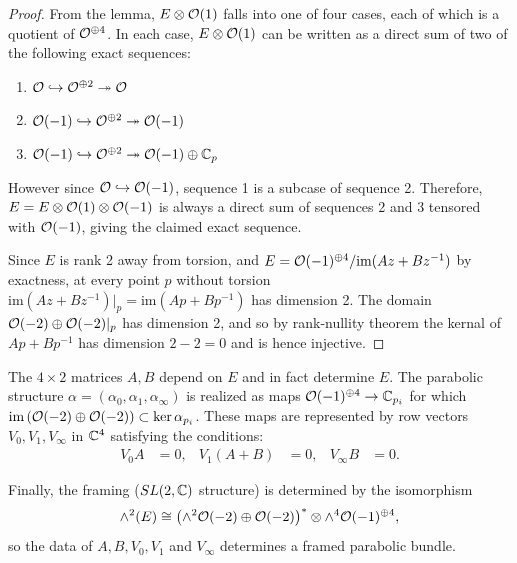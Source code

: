 	\begin{proof}
		From the lemma, $E\otimes \mathcal{O}(1)$ falls into one of four cases, each of which is a quotient of $\mathcal{O}^{\oplus 4}$. In each case, $E\otimes \mathcal{O}(1)$ can be written as a direct sum of two of the following exact sequences:
		\begin{enumerate}
			\item $\mathcal{O} \hookrightarrow \mathcal{O}^{\oplus 2} \twoheadrightarrow \mathcal{O}$
			\item $\mathcal{O}(-1) \hookrightarrow \mathcal{O}^{\oplus 2}\twoheadrightarrow \mathcal{O}(-1) $
			\item $\mathcal{O}(-1)\hookrightarrow \mathcal{O}^{\oplus 2}\twoheadrightarrow \mathcal{O}(-1)\oplus \mathbb{C}_p$
		\end{enumerate}
		However since $\mathcal{O} \hookrightarrow \mathcal{O}(-1)$, sequence 1 is a subcase of sequence 2. Therefore, $E = E\otimes \mathcal{O}(1)\otimes \mathcal{O}(-1)$ is always a direct sum of sequences 2 and 3 tensored with $\mathcal{O}(-1)$, giving the claimed exact sequence.
		
		Since $E$ is rank 2 away from torsion, and $E = \mathcal{O}(-1)^{\oplus 4}/\text{im}(Az+Bz^{-1})$ by exactness, at every point $p$ without torsion $\text{im}(Az+Bz^{-1})|_p = \text{im}(Ap+Bp^{-1})$ has dimension 2. The domain $\mathcal{O}(-2)\oplus\mathcal{O}(-2)|_p$ has dimension 2, and so by rank-nullity theorem the kernal of $Ap+Bp^{-1}$ has dimension $2-2=0$ and is hence injective. 
	\end{proof}
	The $4\times2$ matrices $A,B$ depend on $E$ and in fact determine $E$. The parabolic structure $\alpha = (\alpha_0,\alpha_1,\alpha_\infty)$ is realized as maps $\mathcal{O}(-1)^{\oplus 4}\to \mathbb{C}_{p_i}$ for which $\text{im}\left(\mathcal{O}(-2)\oplus\mathcal{O}(-2)\right) \subset \ker\alpha_{p_i}$. These maps are represented by row vectors $V_0,V_1,V_\infty$ in $\mathbb{C}^4$ satisfying the conditions:
	\begin{align}
		\label{e:p3-conds}
		V_0 A &=0, & V_1(A+B) &= 0, & V_\infty B &=0.
	\end{align}
	
	Finally, the framing ($SL(2,\mathbb{C})$ structure) is determined by the isomorphism
	\begin{equation}
		\wedge^2 (E) \cong \left(\wedge^2 \mathcal{O}(-2)\oplus \mathcal{O}(-2)\right)^\ast\otimes \wedge^4\mathcal{O}(-1)^{\oplus 4},
	\end{equation}
	so the data of $A,B, V_0,V_1$ and $V_\infty$ determines a framed parabolic bundle.
	
